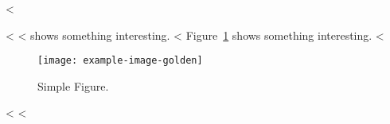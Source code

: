 <%

<%
<%
 shows something interesting.
<%
Figure~\ref{fig:label} shows something interesting.
<%

\begin{figure}
  \centering
  \texttt{[image: example-image-golden]}
  \caption{Simple Figure. \cite[based on][]{mwe}}
  \label{fig:label}
\end{figure}
<%
<%
